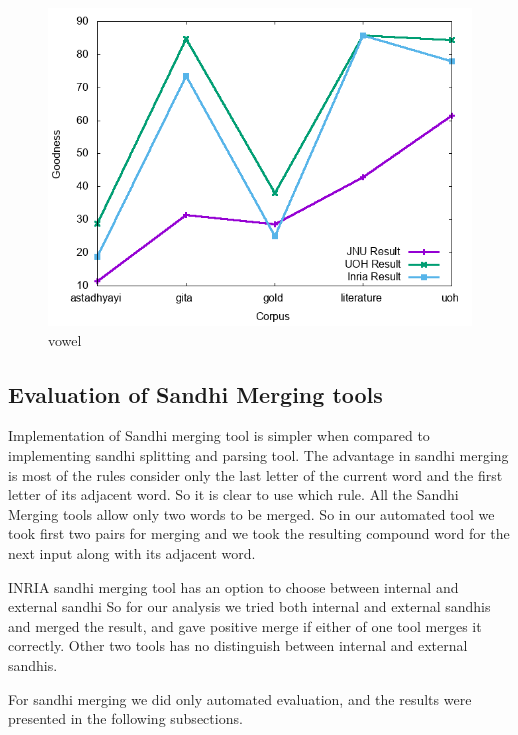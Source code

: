\documentclass[11pt]{article}
\begin{document}
\begin{figure}[h]
	\center
	\includegraphics[scale=0.34]{images/vowel.png}
	\caption{\label{screen}vowel}
\end{figure}

\subsection{Evaluation of Sandhi Merging tools}

Implementation of Sandhi merging tool is simpler when compared to implementing sandhi splitting and parsing tool. The advantage in sandhi merging is most of the rules consider only the last letter of the current word and the first letter of its adjacent word. So it is clear to use which rule. All the Sandhi Merging tools allow only two words to be merged. So in our automated tool we took first two pairs for merging and we took the resulting compound word for the next input along with its adjacent word. 

INRIA sandhi merging tool has an option to choose between internal and external sandhi So for our analysis we tried both internal and external sandhis and merged the result, and gave positive merge if either of one tool merges it correctly. Other two tools has no distinguish between internal and external sandhis.

For sandhi merging we did only automated evaluation, and the results were presented in the following subsections.
\end{document}
